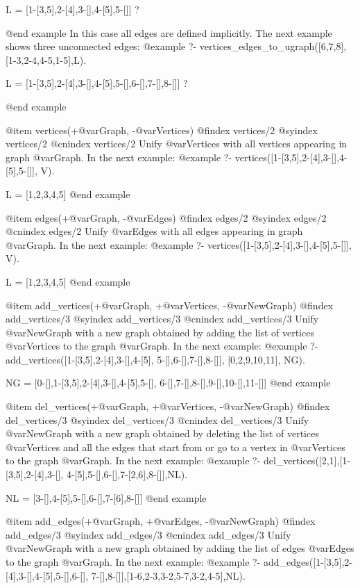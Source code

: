 {{{{{{{{{L = [1-[3,5],2-[4],3-[],4-[5],5-[]] ? 

@end example
In this case all edges are defined implicitly. The next example shows
three unconnected edges:
@example 
?- vertices_edges_to_ugraph([6,7,8],[1-3,2-4,4-5,1-5],L).

L = [1-[3,5],2-[4],3-[],4-[5],5-[],6-[],7-[],8-[]] ? 

@end example

@item vertices(+@var{Graph}, -@var{Vertices})
@findex  vertices/2
@syindex vertices/2
@cnindex vertices/2
Unify @var{Vertices} with all vertices appearing in graph
@var{Graph}. In the next example:
@example
?- vertices([1-[3,5],2-[4],3-[],4-[5],5-[]], V).

L = [1,2,3,4,5]
@end example

@item edges(+@var{Graph}, -@var{Edges})
@findex  edges/2
@syindex edges/2
@cnindex edges/2
Unify @var{Edges} with all edges appearing in graph
@var{Graph}. In the next example:
@example
?- vertices([1-[3,5],2-[4],3-[],4-[5],5-[]], V).

L = [1,2,3,4,5]
@end example

@item add_vertices(+@var{Graph}, +@var{Vertices}, -@var{NewGraph})
@findex  add_vertices/3
@syindex add_vertices/3
@cnindex add_vertices/3
Unify @var{NewGraph} with a new graph obtained by adding the list of
vertices @var{Vertices} to the graph @var{Graph}. In the next example:
@example
?- add_vertices([1-[3,5],2-[4],3-[],4-[5],
                 5-[],6-[],7-[],8-[]],
                [0,2,9,10,11],
                   NG).

NG = [0-[],1-[3,5],2-[4],3-[],4-[5],5-[],
      6-[],7-[],8-[],9-[],10-[],11-[]]
@end example

@item del_vertices(+@var{Graph}, +@var{Vertices}, -@var{NewGraph})
@findex  del_vertices/3
@syindex del_vertices/3
@cnindex del_vertices/3
Unify @var{NewGraph} with a new graph obtained by deleting the list of
vertices @var{Vertices} and all the edges that start from or go to a
vertex in @var{Vertices} to the graph @var{Graph}. In the next example:
@example
?- del_vertices([2,1],[1-[3,5],2-[4],3-[],
                 4-[5],5-[],6-[],7-[2,6],8-[]],NL).

NL = [3-[],4-[5],5-[],6-[],7-[6],8-[]]
@end example

@item add_edges(+@var{Graph}, +@var{Edges}, -@var{NewGraph})
@findex  add_edges/3
@syindex add_edges/3
@cnindex add_edges/3
Unify @var{NewGraph} with a new graph obtained by adding the list of
edges @var{Edges} to the graph @var{Graph}. In the next example:
@example
?- add_edges([1-[3,5],2-[4],3-[],4-[5],5-[],6-[],
              7-[],8-[]],[1-6,2-3,3-2,5-7,3-2,4-5],NL).

}}}}}}}}}
